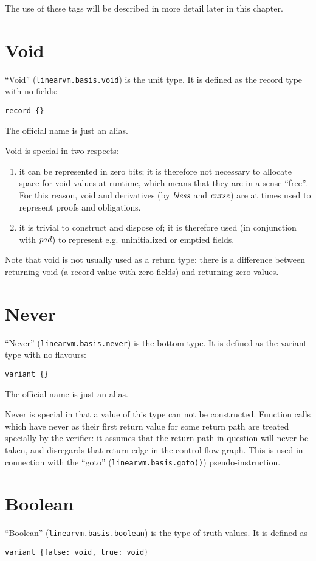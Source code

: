 \documentclass[a4paper]{book}
\newcommand\tyBless{{\ensuremath{\textnormal{\textit{bless}}}}}
\newcommand\tyCurse{{\ensuremath\textit{curse}}}
\newcommand\tyPad{{\ensuremath\textit{pad}}}
\begin{document}
The use of these tags will be described in more detail later in this chapter.

\section{Void}
``Void'' (\texttt{linearvm.basis.void}) is the unit type.
It is defined as the record type with no fields:
\begin{center}
  \verb|record {}|
\end{center}
The official name is just an alias.

Void is special in two respects:
\begin{enumerate}
\item it can be represented in zero bits;
  it is therefore not necessary to allocate space for void values at
  runtime, which means that they are in a sense ``free''.
  For this reason, void and derivatives (by $\tyBless$ and
  $\tyCurse$) are at times used to represent proofs and obligations.
\item it is trivial to construct and dispose of;
  it is therefore used (in conjunction with $\tyPad$) to represent e.g.
  uninitialized or emptied fields.
\end{enumerate}

Note that void is not usually used as a return type: there is a
difference between returning void (a record value with zero fields)
and returning zero values.

\section{Never}
``Never'' (\texttt{linearvm.basis.never}) is the bottom type.
It is defined as the variant type with no flavours:
\begin{center}
  \verb|variant {}|
\end{center}
The official name is just an alias.

Never is special in that a value of this type can not be constructed.
Function calls which have never as their first return value for some return
path are treated specially by the verifier: it assumes that the return
path in question will never be taken, and disregards that return edge
in the control-flow graph.
This is used in connection with the ``goto'' (\texttt{linearvm.basis.goto()})
pseudo-instruction.

\section{Boolean}
``Boolean'' (\texttt{linearvm.basis.boolean}) is the type of truth values.
It is defined as
\begin{center}
  \verb|variant {false: void, true: void}|
\end{center}
\end{document}
